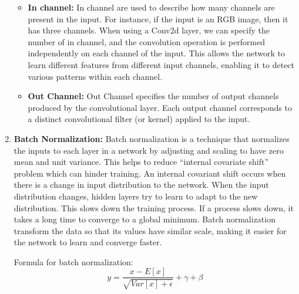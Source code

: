 \begin{enumerate}[label=(\roman*)]
\begin{itemize}
            \item {\bf In channel:} In channel are used to describe how many channels are present in the input. For instance, if the input is an RGB image, then it has three channels. When using a Conv2d layer, we can specify the number of in channel, and the convolution operation is performed independently on each channel of the input. This allows the network to learn different features from different input channels, enabling it to detect various patterns within each channel.
            \item {\bf Out Channel:} Out Channel specifies the number of output channels produced by the convolutional layer. Each output channel corresponds to a distinct convolutional filter (or kernel) applied to the input.
        \end{itemize}
        \item {\bf Batch Normalization:} Batch normalization is a technique that normalizes the inputs to each layer in a network by adjusting and scaling to have zero mean and unit variance. This helps to reduce “internal covariate shift” problem which can hinder training. An internal covariant shift occurs when there is a change in input distribution to the network. When the input distribution changes, hidden layers try to learn to adapt to the new distribution. This slows down the training process. If a process slows down, it takes a long time to converge to a global minimum. Batch normalization transform the data so that its values have similar scale, making it easier for the network to learn and converge faster. \par
        Formula for batch normalization:      
        \begin{equation}
        y = \frac{x - E [x]}{\sqrt{Var[x] + \epsilon }}+\gamma + \beta    
        \end{equation}      
         

\end{enumerate}
